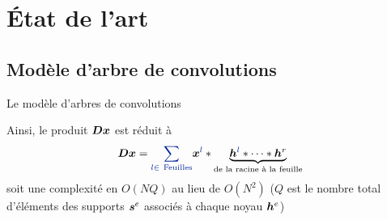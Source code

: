 \section{État de l'art}


\subsection{Modèle d'arbre de convolutions}


\begin{frame}{Le modèle d'arbres de convolutions}
\begin{figure}\centering
{}
\end{figure}
Ainsi, le produit $\bm{D}\bm{x}$ est réduit à
\begin{equation} 
\D \x = \Beq{\sum_{l \in ~\text{Feuilles}}} \x^{\Beq{l}} * \underbrace{\h^{\Beq{l}}* \dots* \h^{r}}_{\textrm{de la racine à la feuille}}
\end{equation}
soit une complexité en \alert{$O(NQ)$} au lieu de $O(N^2)$ ($Q$ est le nombre total d'éléments des supports $\bm{s}^e$ associés à chaque noyau $\bm{h}^e$)
\end{frame}
 

